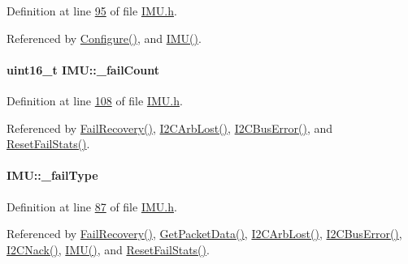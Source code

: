 Definition at line \hyperlink{_i_m_u_8h_source_l00095}{95} of file \hyperlink{_i_m_u_8h_source}{IMU.h}.



Referenced by \hyperlink{_i_m_u_8cpp_source_l00803}{Configure()}, and \hyperlink{_i_m_u_8cpp_source_l00020}{IMU()}.

\hypertarget{class_i_m_u_a1e646aa38b84721fc650ef5d3388cc14}{
\paragraph[{\_\-failCount}]{\setlength{\rightskip}{0pt plus 5cm}uint16\_\-t {\bf IMU::\_\-failCount}}\hfill}
\label{class_i_m_u_a1e646aa38b84721fc650ef5d3388cc14}


Definition at line \hyperlink{_i_m_u_8h_source_l00108}{108} of file \hyperlink{_i_m_u_8h_source}{IMU.h}.



Referenced by \hyperlink{_i_m_u_8cpp_source_l00398}{FailRecovery()}, \hyperlink{_i_m_u_8cpp_source_l00534}{I2CArbLost()}, \hyperlink{_i_m_u_8cpp_source_l00499}{I2CBusError()}, and \hyperlink{_i_m_u_8h_source_l00200}{ResetFailStats()}.

\hypertarget{class_i_m_u_a39ed63b67b50c67520c5f8e5a2c26b26}{
\paragraph[{\_\-failType}]{ {\bf IMU::\_\-failType}}\hfill}
\label{class_i_m_u_a39ed63b67b50c67520c5f8e5a2c26b26}


Definition at line \hyperlink{_i_m_u_8h_source_l00087}{87} of file \hyperlink{_i_m_u_8h_source}{IMU.h}.



Referenced by \hyperlink{_i_m_u_8cpp_source_l00398}{FailRecovery()}, \hyperlink{_i_m_u_8cpp_source_l00603}{GetPacketData()}, \hyperlink{_i_m_u_8cpp_source_l00534}{I2CArbLost()}, \hyperlink{_i_m_u_8cpp_source_l00499}{I2CBusError()}, \hyperlink{_i_m_u_8cpp_source_l00463}{I2CNack()}, \hyperlink{_i_m_u_8cpp_source_l00020}{IMU()}, and \hyperlink{_i_m_u_8h_source_l00200}{ResetFailStats()}.

